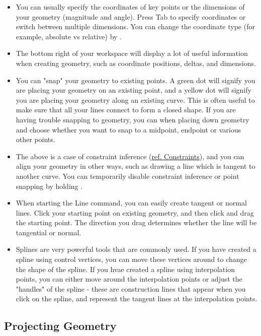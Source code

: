 \cbstart
{}

\begin{itemize}
    \item You can usually specify the coordinates of key points or the dimensions of your geometry (magnitude and angle). Press Tab to specify coordinates or switch between multiple dimensions. You can change the coordinate type (for example, absolute vs relative) by .
    \item The bottom right of your workspace will display a lot of useful information when creating geometry, such as coordinate positions, deltas, and dimensions.
    \item You can "snap" your geometry to existing points. A green dot will signify you are placing your geometry on an existing point, and a yellow dot will signify you are placing your geometry along an existing curve. This is often useful to make sure that all your lines connect to form a closed shape. If you are having trouble snapping to geometry, you can  when placing down geometry and choose whether you want to snap to a midpoint, endpoint or various other points.
    \item The above is a case of constraint inference (\hyperref[chap:constraints]{ref. Constraints}), and you can align your geometry in other ways, such as drawing a line which is tangent to another curve. You can temporarily disable constraint inference or point snapping by holding .
    \item When starting the Line command, you can easily create tangent or normal lines. Click your starting point on existing geometry, and then click and drag the starting point. The direction you drag determines whether the line will be tangential or normal.
    \item Splines are very powerful tools that are commonly used. If you have created a spline using control vertices, you can move these vertices around to change the shape of the spline. If you hvae created a spline using interpolation points, you can either move around the interpolation points or adjust the "handles" of the spline - these are construction lines that appear when you click on the spline, and represent the tangent lines at the interpolation points.
\end{itemize}

\cbend

\subsection{Projecting Geometry}

